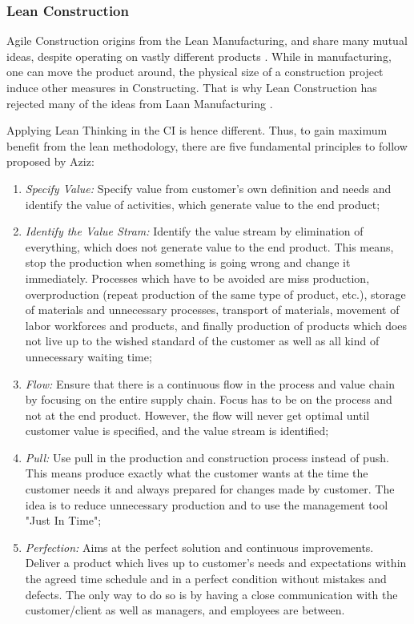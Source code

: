 \subsubsection{Lean Construction}\label{sec:lean_construction}
Agile Construction origins from the Lean Manufacturing, and share many mutual ideas, despite operating on vastly different products \cite{salem2006lean}. While in manufacturing, one can move the product around, the physical size of a construction project induce other measures in Constructing. That is why Lean Construction has rejected many of the ideas from Laan Manufacturing \cite{howell1999lean}. 

Applying Lean Thinking in the CI is hence different. Thus, to gain maximum benefit from the lean methodology, there are five fundamental principles to follow proposed by Aziz\cite{aziz2013applying}: 
\begin{enumerate}
    \item {\it Specify Value:} Specify value from customer's own definition and needs and identify the value of activities, which generate value to the end product;
    \item {\it Identify the Value Stram:} Identify the value stream by elimination of everything, which does not generate value to the end product. This means, stop the production when something is going wrong and change it immediately. Processes which have to be avoided are miss production, overproduction (repeat production of the same type of product, etc.), storage of materials and unnecessary processes, transport of materials, movement of labor workforces and products, and finally production of products which does not live up to the wished standard of the customer as well as all kind of unnecessary waiting time;
    \item {\it Flow:} Ensure that there is a continuous flow in the process and value chain by focusing on the entire supply chain. Focus has to be on the process and not at the end product. However, the flow will never get optimal until customer value is specified, and the value stream is identified;
    \item {\it Pull:} Use pull in the production and construction process instead of push. This means produce exactly what the customer wants at the time the customer needs it and always prepared for changes made by customer. The idea is to reduce unnecessary production and to use the management tool "Just In Time";
    \item {\it Perfection:} Aims at the perfect solution and continuous improvements. Deliver a product which lives up to customer's needs and expectations within the agreed time schedule and in a perfect condition without mistakes and defects. The only way to do so is by having a close communication with the customer/client as well as managers, and employees are between.
\end{enumerate}

